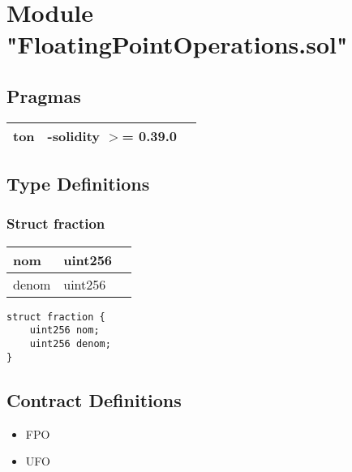 
\section{Module "FloatingPointOperations.sol"}


\subsection{Pragmas}


\noindent\begin{tabular}{|l|l|p{5cm}|}\hline
ton & -solidity $>$= 0.39.0 &\\\hline
\end{tabular}


\subsection{Type Definitions}


\subsubsection{Struct fraction}


\ifsoltables
\noindent\begin{tabular}{|l|l|p{6cm}|}\hline
nom & uint256 & \\\hline
denom & uint256 & \\\hline
\end{tabular}
\fi


\begin{lstlisting}[firstnumber=3]
struct fraction {
    uint256 nom;
    uint256 denom;
}
\end{lstlisting}

\subsection{Contract Definitions}

\begin{itemize}
\item FPO
\item UFO
\end{itemize}
